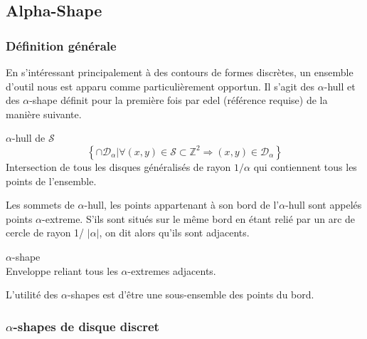 \subsection{Alpha-Shape}

\subsubsection{Définition générale}

En s'intéressant principalement à des contours de formes discrètes, un ensemble d'outil nous est apparu comme particulièrement opportun. Il s'agit des $\alpha$-hull et des $\alpha$-shape définit pour la première fois par edel (référence requise) de la manière suivante.

\begin{Definition}{$\alpha$-hull de $\mathcal{S}$}
\label{def:ah}
    $$\left\{ \cap \mathcal{D}_{\alpha} | \forall (x,y)\in \mathcal{S} \subset \mathbb{Z}^{2} \Rightarrow (x,y) \in \mathcal{D}_{\alpha} \right\}$$
    Intersection de tous les disques généralisés de rayon $1/\alpha$ qui contiennent tous les points de l'ensemble.
\end{Definition}


Les sommets de $\alpha$-hull, les points appartenant à son bord de l'$\alpha$-hull sont appelés points $\alpha$-extreme. S'ils sont situés sur le même bord en étant relié par un arc de cercle de rayon 1/ $\lvert \alpha \rvert$, on dit alors qu'ils sont adjacents.

\begin{Definition}{$\alpha$-shape}\\
\label{def:as}
      Enveloppe reliant tous les $\alpha$-extremes adjacents.
\end{Definition}


L'utilité des $\alpha$-shapes est d'être une sous-ensemble des points du bord. 

\subsubsection{$\alpha$-shapes de disque discret}

